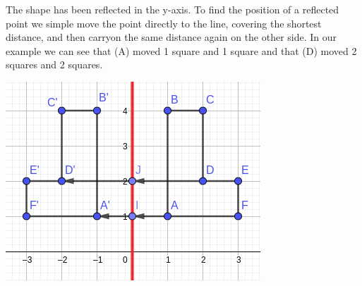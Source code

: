 \bigskip

The shape has been reflected in the y-axis.  To find the position of a reflected point we simple move the point directly to the line, covering the shortest distance, and then carryon the same distance again on the other side.  In our example we can see that (A) moved 1 square and 1 square and that (D) moved 2 squares and 2 squares.

\bigskip

	\includegraphics[scale=0.6]{./Images/Transformations/Reflections_ex_2.png}

\bigskip

